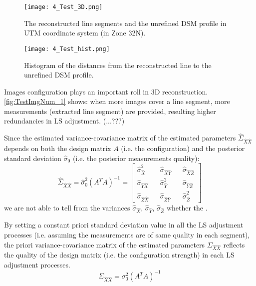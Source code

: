 \begin{figure}
  \centering
  \texttt{[image: 4\_Test\_3D.png]} %
  \caption{\small The reconstructed line segments and the unrefined DSM profile in UTM coordinate system (in Zone 32N).}
  \label{fig:Test3D_1}
  \vspace{1cm}
  \texttt{[image: 4\_Test\_hist.png]} %
  \caption{\small Histogram of the distances from the reconstructed line to the unrefined DSM profile.}
  \label{fig:TestHist_1}
\end{figure}

\clearpage

Images configuration plays an important roll in 3D reconstruction. %
\cref{fig:TestImgNum_1} shows: when more images cover a line segment, more measurements (extracted line segment) are provided, resulting higher redundancies in LS adjustment. (...???)

Since the estimated variance-covariance matrix of the estimated parameters $\hat{\Sigma}_{\hat{X}\hat{X}}$ depends on both the design matrix $A$ (i.e. the configuration) and the posterior standard deviation $\hat{\sigma}_0$ (i.e. the posterior measurements quality):
\begin{equation}
\hat{\Sigma}_{\hat{X}\hat{X}}=\hat{\sigma}_0^2(A^TA)^{-1}=
\begin{bmatrix}
\hat{\sigma}_{\hat{X}}^2 && \hat{\sigma}_{\hat{X}\hat{Y}} && \hat{\sigma}_{\hat{X}\hat{Z}} \\
\hat{\sigma}_{\hat{Y}\hat{X}} && \hat{\sigma}_{\hat{Y}}^2 && \hat{\sigma}_{\hat{Y}\hat{Z}} \\
\hat{\sigma}_{\hat{Z}\hat{X}} && \hat{\sigma}_{\hat{Z}\hat{Y}} && \hat{\sigma}_{\hat{Z}}^2
\end{bmatrix}
\end{equation}
we are not able to tell from the variances $\hat{\sigma}_{\hat{X}}$, $\hat{\sigma}_{\hat{Y}}$, $\hat{\sigma}_{\hat{Z}}$ whether the .

By setting a constant priori standard deviation value in all the LS adjustment processes (i.e. assuming the measurements are of same quality in each segment), the priori variance-covariance matrix of the estimated parameters $\Sigma_{\hat{X}\hat{X}}$ reflects the quality of the design matrix (i.e. the configuration strength) in each LS adjustment processes.
\begin{equation}
\Sigma_{\hat{X}\hat{X}}=\sigma_0^2(A^TA)^{-1}
\end{equation}

